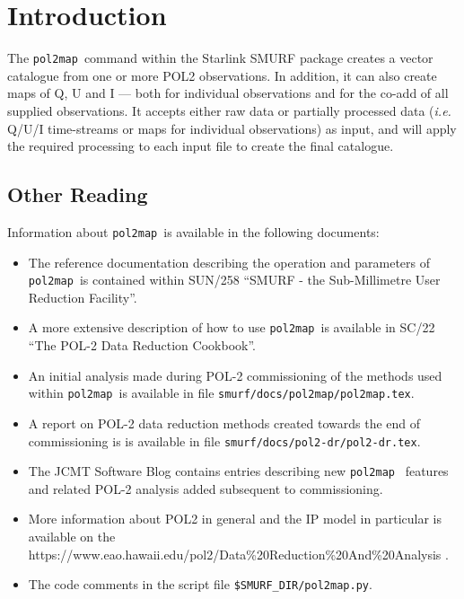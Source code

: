 \documentclass[twoside,11pt]{starlink}
\begin{document}
\scfrontmatter

\newcommand{\ptmap}{\texttt{pol2map}\ }
\newcommand{\mmap}{\texttt{makemap}\ }
\newcommand{\sloop}{\texttt{skyloop}\ }
\newcommand{\cqu}{\texttt{calcqu}\ }
\newcommand{\cp}[1]{configuration parameter \texttt{#1}\ }
\newcommand{\pp}[1]{the \texttt{pol2map} parameter \texttt{#1}\ }
\newcommand{\Pp}[1]{The \texttt{pol2map} parameter \texttt{#1}\ }

\section{Introduction}
The \ptmap command within the Starlink SMURF package creates a
vector catalogue from one or more POL2 observations.  In addition, it can
also create maps of Q, U and I --- both for individual observations and for
the co-add of all supplied observations. It accepts either raw data or
partially processed data (\emph{i.e.} Q/U/I time-streams or maps for
individual observations) as input, and will apply the required processing
to each input file to create the final catalogue.

\subsection{Other Reading}
Information about \ptmap is available in the
following documents:
\begin{itemize}
\item The reference documentation describing the operation and parameters of
\ptmap is contained within SUN/258 ``SMURF - the Sub-Millimetre User Reduction Facility''.
\item A more extensive description of how to use \ptmap is available
in SC/22 ``The POL-2 Data Reduction Cookbook''.
\item An initial analysis made during POL-2 commissioning of the methods used within
\ptmap is available in file \texttt{smurf/docs/pol2map/pol2map.tex}.
\item A report on POL-2 data reduction methods created towards the end of
commissioning is is available in file \texttt{smurf/docs/pol2-dr/pol2-dr.tex}.
\item The JCMT Software Blog contains entries describing new \ptmap
features and related POL-2 analysis added subsequent to commissioning.
\item More information about POL2 in general and the IP model in
particular is available on the
{https://www.eao.hawaii.edu/pol2/Data\%20Reduction\%20And\%20Analysis}
.
\item The code comments in the script file \texttt{\$SMURF\_DIR/pol2map.py}.
\end{itemize}
\end{document}
